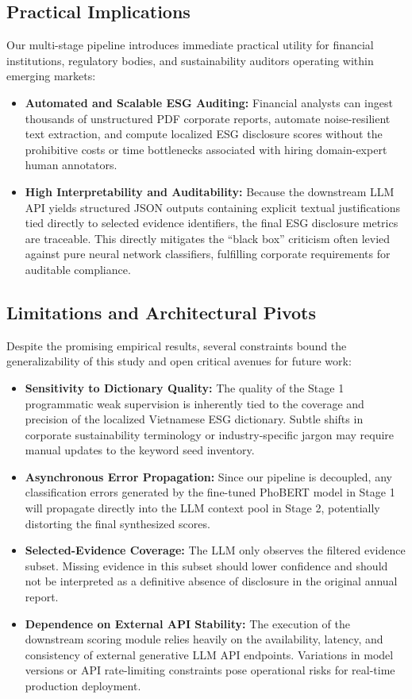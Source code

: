 \documentclass{article}
\theoremstyle{plain}
\theoremstyle{definition}
\theoremstyle{remark}
\begin{document}
\subsection{Practical Implications}
Our multi-stage pipeline introduces immediate practical utility for financial institutions, regulatory bodies, and sustainability auditors operating within emerging markets:
\begin{itemize}
    \item \textbf{Automated and Scalable ESG Auditing:} Financial analysts can ingest thousands of unstructured PDF corporate reports, automate noise-resilient text extraction, and compute localized ESG disclosure scores without the prohibitive costs or time bottlenecks associated with hiring domain-expert human annotators.
    \item \textbf{High Interpretability and Auditability:} Because the downstream LLM API yields structured JSON outputs containing explicit textual justifications tied directly to selected evidence identifiers, the final ESG disclosure metrics are traceable. This directly mitigates the ``black box'' criticism often levied against pure neural network classifiers, fulfilling corporate requirements for auditable compliance.
\end{itemize}

\subsection{Limitations and Architectural Pivots}
Despite the promising empirical results, several constraints bound the generalizability of this study and open critical avenues for future work:
\begin{itemize}
    \item \textbf{Sensitivity to Dictionary Quality:} The quality of the Stage 1 programmatic weak supervision is inherently tied to the coverage and precision of the localized Vietnamese ESG dictionary. Subtle shifts in corporate sustainability terminology or industry-specific jargon may require manual updates to the keyword seed inventory.
    \item \textbf{Asynchronous Error Propagation:} Since our pipeline is decoupled, any classification errors generated by the fine-tuned PhoBERT model in Stage 1 will propagate directly into the LLM context pool in Stage 2, potentially distorting the final synthesized scores.
    \item \textbf{Selected-Evidence Coverage:} The LLM only observes the filtered evidence subset. Missing evidence in this subset should lower confidence and should not be interpreted as a definitive absence of disclosure in the original annual report.
    \item \textbf{Dependence on External API Stability:} The execution of the downstream scoring module relies heavily on the availability, latency, and consistency of external generative LLM API endpoints. Variations in model versions or API rate-limiting constraints pose operational risks for real-time production deployment.
\end{itemize}
\end{document}
